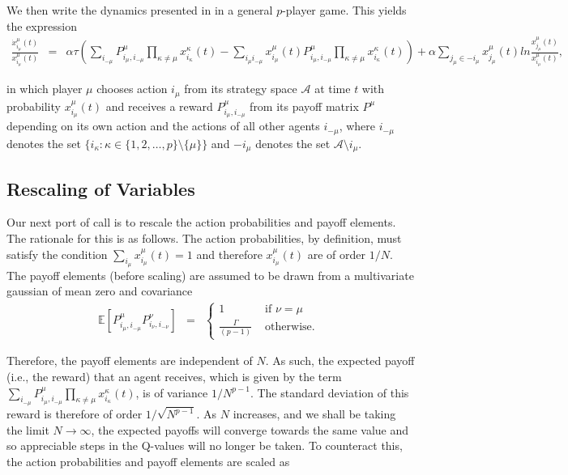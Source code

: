 \documentclass{article}
\newcommand{\xmu}[2]{x_{#1_#2}^{#2}(t)}
\newcommand{\payoff}[2]{P^{#2}_{#1_#2, #1_{-#2}}}
\newcommand{\dxmu}[1]{\dot{x}_{#1_\mu}^{\mu} (t)}
\begin{document}
We then write the dynamics presented in \cite{Tuyls2006AnGames} in a general $p$-player game. This yields the expression
%
\begin{eqnarray}
    \label{eqn::pEOM}
    \frac{\dxmu{i}}{\xmu{i}{\mu}} & = & \alpha \tau ( \sum_{i_{-\mu}} \payoff{i}{\mu} \prod_{\kappa \neq \mu} \xmu{i}{\kappa} - \sum_{i_\mu i_{-\mu}} \xmu{i}{\mu} \payoff{i}{\mu} \prod_{\kappa \neq \mu} \xmu{i}{\kappa} ) + \alpha \sum_{j_\mu \in -i_\mu} \xmu{j}{\mu} ln \frac{\xmu{j}{\mu}}{\xmu{i}{\mu}},
\end{eqnarray}

in which player $\mu$
chooses action $i_{\mu}$ from its strategy space $\mathcal{A}$ at time
$t$ with probability $\xmu{i}{\mu}$ and receives a reward
$\payoff{i}{\mu}$ from its payoff matrix $P^\mu$ depending on its own
action and the actions of all other agents $i_{-\mu}$, where $i_{-\mu}$ denotes the set $\{ i_\kappa : \kappa \in \{1, 2,
\ldots , p\} \setminus \{\mu\} \}$ and $-i_{\mu}$ denotes the set
$\mathcal{A} \setminus {i_\mu}$.

\subsection{Rescaling of Variables}

Our next port of call is to rescale the action probabilities and payoff elements. The rationale for this is as follows. The action probabilities, by definition, must satisfy the condition $\sum_{i_\mu} \xmu{i}{\mu} = 1$ and therefore $\xmu{i}{\mu}$ are of order $1/N$. The payoff elements (before scaling) are assumed to be drawn from a multivariate gaussian of mean zero and covariance
%
\begin{eqnarray}
\label{eqn::Payoffs}
        \mathbb{E}\left [ \payoff{i}{\mu} \payoff{i}{\nu} \right] & = & \begin{cases}
        1 &  \text{ if } \nu = \mu \\
        \frac{\Gamma}{(p-1)} & \text{ otherwise. }
        \end{cases}
\end{eqnarray}

Therefore, the payoff elements are independent of $N$. As such, the expected payoff (i.e., the reward) that an agent receives, which is given by the term $\sum_{i_{-\mu}} \payoff{i}{\mu} \prod_{\kappa \neq \mu} \xmu{i}{\kappa}$, is of variance $1/N^{p-1}$. The standard deviation of this reward is therefore of order $1/\sqrt{N^{p-1}}$. As $N$ increases, and we shall be taking the limit $N \rightarrow \infty$, the expected payoffs will converge towards the same value and so appreciable steps in the Q-values will no longer be taken. To counteract this, the action probabilities and payoff elements are scaled as
\end{document}
